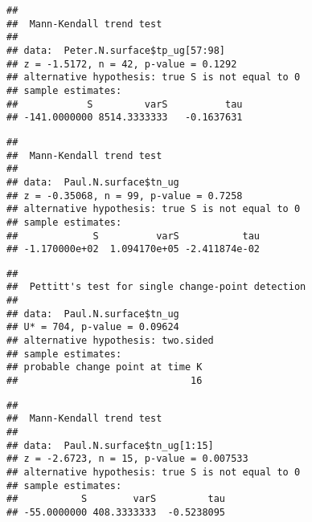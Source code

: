 \documentclass[]{article}
\newenvironment{Shaded}{\begin{snugshade}}{\end{snugshade}}
\newcommand{\KeywordTok}[1]{\textcolor[rgb]{0.13,0.29,0.53}{\textbf{#1}}}
\newcommand{\DecValTok}[1]{\textcolor[rgb]{0.00,0.00,0.81}{#1}}
\newcommand{\CommentTok}[1]{\textcolor[rgb]{0.56,0.35,0.01}{\textit{#1}}}
\newcommand{\OperatorTok}[1]{\textcolor[rgb]{0.81,0.36,0.00}{\textbf{#1}}}
\newcommand{\NormalTok}[1]{#1}
\begin{document}
\begin{verbatim}
## 
##  Mann-Kendall trend test
## 
## data:  Peter.N.surface$tp_ug[57:98]
## z = -1.5172, n = 42, p-value = 0.1292
## alternative hypothesis: true S is not equal to 0
## sample estimates:
##            S         varS          tau 
## -141.0000000 8514.3333333   -0.1637631
\end{verbatim}

\begin{Shaded}
\end{Shaded}

\begin{verbatim}
## 
##  Mann-Kendall trend test
## 
## data:  Paul.N.surface$tn_ug
## z = -0.35068, n = 99, p-value = 0.7258
## alternative hypothesis: true S is not equal to 0
## sample estimates:
##             S          varS           tau 
## -1.170000e+02  1.094170e+05 -2.411874e-02
\end{verbatim}

\begin{Shaded}
\end{Shaded}

\begin{verbatim}
## 
##  Pettitt's test for single change-point detection
## 
## data:  Paul.N.surface$tn_ug
## U* = 704, p-value = 0.09624
## alternative hypothesis: two.sided
## sample estimates:
## probable change point at time K 
##                              16
\end{verbatim}

\begin{Shaded}
\end{Shaded}

\begin{verbatim}
## 
##  Mann-Kendall trend test
## 
## data:  Paul.N.surface$tn_ug[1:15]
## z = -2.6723, n = 15, p-value = 0.007533
## alternative hypothesis: true S is not equal to 0
## sample estimates:
##           S        varS         tau 
## -55.0000000 408.3333333  -0.5238095
\end{verbatim}
\end{document}
